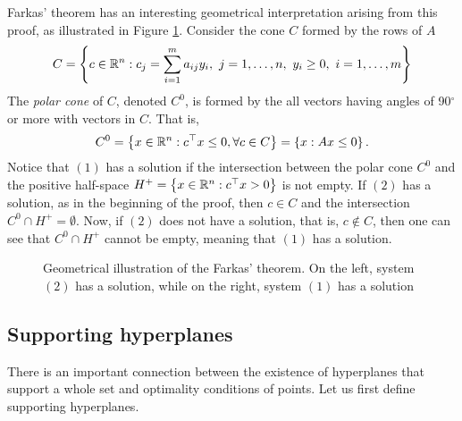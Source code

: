Farkas' theorem has an interesting geometrical interpretation arising from this proof, as illustrated in Figure \ref{fig:farkas}. Consider the cone $C$ formed by the rows of $A$
%
\begin{align*} 
	C = \left\{ c \in \mathbb{R}^n : c_j = \sum_{i=1}^m a_{ij} y_i, \ j= 1,\dots,n, \  y_i \geq 0, \ i =1,\dots, m \right \}
\end{align*}
%
The \emph{polar cone} of $C$, denoted $C^0$, is formed by the all vectors having angles of 90$^\circ$ or more with vectors in $C$. That is, 
%
\begin{align*}
	C^0 = \left\{ x \in \mathbb{R}^n : c^\top x \le 0, \forall c \in C \right \} = \left\{ x : Ax \leq 0 \right \}.
\end{align*}
%
Notice that $(1)$ has a solution if the intersection between the polar cone $C^0$ and the positive half-space $H^+ = \left\{ x \in \mathbb{R}^n: c^\top x > 0 \right \}$ is not empty. If $(2)$ has a solution, as in the beginning of the proof, then $c \in C$ and the intersection $C^0 \cap H^+ = \emptyset$. Now, if $(2)$ does not have a solution, that is, $c \notin C$, then one can see that $C^0 \cap H^+$ cannot be empty, meaning that $(1)$ has a solution.  

\begin{figure}[h]
	\caption{Geometrical illustration of the Farkas' theorem. On the left, system $(2)$ has a solution, while on the right, system $(1)$ has a solution} \label{fig:farkas}
\end{figure}


\subsection{Supporting hyperplanes}

There is an important connection between the existence of hyperplanes that support a whole set and optimality conditions of points. Let us first define supporting hyperplanes. 

